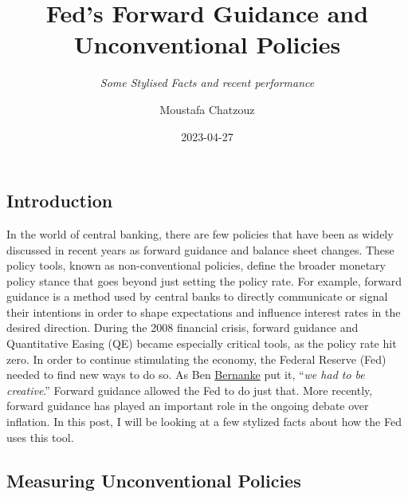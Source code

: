 \documentclass[
  letterpaper,
  DIV=11,
  numbers=noendperiod]{scrartcl}
\title{Fed's Forward Guidance and Unconventional Policies}
\subtitle{\emph{Some Stylised Facts and recent performance}}
\author{Moustafa Chatzouz}
\date{2023-04-27}
\renewcommand*\contentsname{Table of contents}
\newcommand\contentsname{Table of contents}
\begin{document}
\maketitle
\ifdefined\Shaded\renewenvironment{Shaded}{\begin{tcolorbox}[interior hidden, sharp corners, boxrule=0pt, breakable, enhanced, borderline west={3pt}{0pt}{shadecolor}, frame hidden]}{\end{tcolorbox}}\fi

\renewcommand*\contentsname{Table of contents}
{
\hypersetup{linkcolor=}
\setcounter{tocdepth}{3}
\tableofcontents
}
\hypertarget{introduction}{%
\subsection{Introduction}\label{introduction}}

In the world of central banking, there are few policies that have been
as widely discussed in recent years as forward guidance and balance
sheet changes. These policy tools, known as non-conventional policies,
define the broader monetary policy stance that goes beyond just setting
the policy rate. For example, forward guidance is a method used by
central banks to directly communicate or signal their intentions in
order to shape expectations and influence interest rates in the desired
direction. During the 2008 financial crisis, forward guidance and
Quantitative Easing (QE) became especially critical tools, as the policy
rate hit zero. In order to continue stimulating the economy, the Federal
Reserve (Fed) needed to find new ways to do so. As Ben
\href{https://www.amazon.co.uk/21st-Century-Monetary-Policy-Inflation/dp/1324020466/ref=sr_1_1?adgrpid=1172080352962224\&hvadid=73255235197595\&hvbmt=be\&hvdev=c\&hvlocphy=4923\&hvnetw=o\&hvqmt=e\&hvtargid=kwd-73255197392577\%3Aloc-188\&hydadcr=18495_2211395\&keywords=21st+century+monetary+policy\&qid=1681764141\&sr=8-1}{Bernanke}
put it, ``\emph{we had to be creative}.'' Forward guidance allowed the
Fed to do just that. More recently, forward guidance has played an
important role in the ongoing debate over inflation. In this post, I
will be looking at a few stylized facts about how the Fed uses this
tool.

\hypertarget{measuring-unconventional-policies}{%
\subsection{Measuring Unconventional
Policies}\label{measuring-unconventional-policies}}
\end{document}
